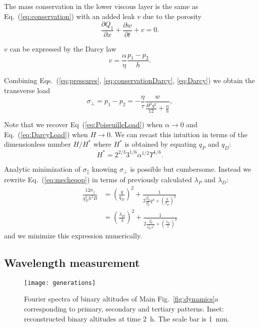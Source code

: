 \documentclass[twocolumn,superscriptaddress,showpacs,preprintnumbers,
amsmath,amssymb,prl]{revtex4-1}
\begin{document}
The mass conservation in the lower viscous layer is the same as Eq.~(\ref{eq:conservation}) with an added leak $v$ due to the porosity
\begin{equation}
\frac{\partial Q_1}{\partial x} + \frac{\partial w}{\partial t} + v = 0.
\label{eq:conservationDarcy}
\end{equation}

$v$ can be expressed by the Darcy law
\begin{equation}
v = \frac{\alpha}{\eta} \frac{p_1-p_2}{h}.
\label{eq:Darcy}
\end{equation}

Combining Eqs.~(\ref{eq:pressures}, \ref{eq:conservationDarcy}, \ref{eq:Darcy}) we obtain the transverse load
\begin{equation}
\sigma_\perp = p_1-p_2 = - \frac{\eta}{\tau} \frac{w}{\frac{H^3 q^2}{12} + \frac{\alpha}{h}},
\label{eq:MixtLoad}
\end{equation}

Note that we recover Eq~(\ref{eq:PoiseuilleLoad}) when $\alpha \rightarrow 0$ and Eq.~(\ref{eq:DarcyLoad}) when $H \rightarrow 0$. We can recast this intuition in terms of the dimensionless number $H/H^*$ where $H^*$ is obtained by equating $q_P$ and $q_D$:
\begin{equation}
H^* = 2^{2/3} 3^{1/6} \alpha^{1/2} \Upsilon^{1/6}.
\end{equation}

Analytic minimization of $\sigma_\parallel$ knowing $\sigma_\perp$ is possible but cumbersome. Instead we rewrite Eq.~(\ref{eq:mecheqop}) in terms of previously calculated $\lambda_P$ and $\lambda_D$:
\begin{align}
\frac{12\sigma_\parallel}{q_D^2 h^2 B} &= \left(\frac{q}{q_D}\right)^2 + \frac{1}{2\frac{q_D^2}{q_P^6}q^4  + \left(\frac{q}{q_D}\right)^2}\\
&= \left(\frac{\lambda_D}{\lambda}\right)^2 + \frac{1}{2\frac{\lambda_P^6}{\lambda_D^2\lambda^4}  + \left(\frac{\lambda_D}{\lambda}\right)^2}
\end{align}
and we minimize this expression numerically.

\subsection*{Wavelength measurement}

\begin{figure}
	\texttt{[image: generations]}%
	\caption{Fourier spectra of binary altitudes of Main Fig.~\ref{fig:dynamics}a corresponding to primary, secondary and tertiary patterns. Inset: reconstructed binary altitudes at time \SI{2}{\hour}. The scale bar is \SI{1}{\milli\metre}.}%
	\label{fig:generations}%
\end{figure}
\end{document}
